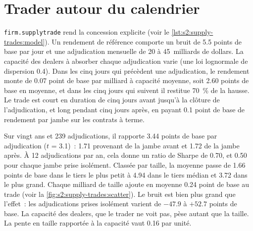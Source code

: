 \section{Trader autour du calendrier}

\texttt{firm.supplytrade} rend la concession explicite (voir le \cref{lst:s2:supply-trades:model}). Un rendement de référence comporte un bruit de 5.5 points de base par jour
et une adjudication mensuelle de 20 à 45~milliards de dollars. La capacité des dealers à absorber chaque adjudication varie (une loi lognormale de dispersion 0.4). Dans les cinq
jours qui précèdent une adjudication, le rendement monte de 0.07 point de base par milliard à capacité moyenne, soit 2.60 points de base en moyenne, et dans les cinq jours qui suivent il restitue
70~\% de la hausse. Le trade est court en duration de cinq jours avant jusqu'à la clôture de l'adjudication, et long pendant cinq jours après, en payant 0.1 point de base de
rendement par jambe sur les contrats à terme.

Sur vingt ans et 239 adjudications, il rapporte 3.44 points de base par adjudication ($t$ = 3.1)~: 1.71 provenant de la jambe avant et 1.72 de la jambe après. À 12
adjudications par an, cela donne un ratio de Sharpe de 0.70, et 0.50 pour chaque jambe prise isolément. Classée par taille, la moyenne passe de 1.66 points de base dans le
tiers le plus petit à 4.94 dans le tiers médian et 3.72 dans le plus grand. Chaque milliard de taille ajoute en moyenne 0.24 point de base au trade
(voir la \cref{fig:s2:supply-trades:scatter}). Le bruit est bien plus grand que l'effet~: les adjudications prises isolément varient de $-47.9$ à $+52.7$ points de base. La capacité
des dealers, que le trader ne voit pas, pèse autant que la taille. La pente en taille rapportée à la capacité vaut 0.16 par unité.

\begin{omfigure}

\label{fig:s2:supply-trades:scatter}
\end{omfigure}

